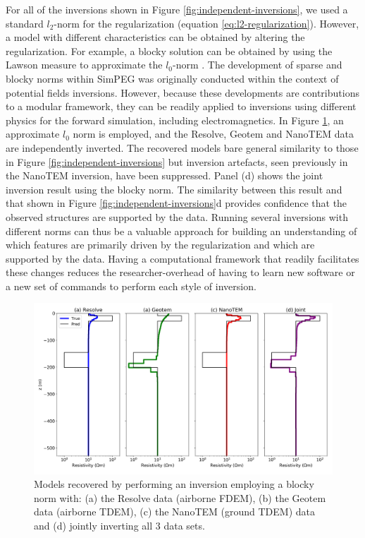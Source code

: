 \documentclass[paper]{geophysics}
\begin{document}
For all of the inversions shown in Figure \ref{fig:independent-inversions}, we used a standard $l_2$-norm for the regularization (equation \ref{eq:l2-regularization}). However, a model with different characteristics can be obtained by altering the regularization. For example, a blocky solution can be obtained by using the Lawson measure to approximate the $l_0$-norm \citep{Fournier2016, Lawson1961}. The development of sparse and blocky norms within SimPEG was originally conducted within the context of potential fields inversions. However, because  these developments are contributions to a modular framework, they can be readily applied to inversions using different physics for the forward simulation, including electromagnetics. In Figure \ref{fig:blocky-inversion}, an approximate $l_0$ norm is employed, and the Resolve, Geotem and NanoTEM data are independently inverted. The recovered models bare general similarity to those in Figure \ref{fig:independent-inversions} but inversion artefacts, seen previously in the NanoTEM inversion, have been suppressed. Panel (d) shows the joint inversion result using the blocky norm. The similarity between this result and that shown in Figure \ref{fig:independent-inversions}d provides confidence that the observed structures are supported by the data. Running several inversions with different norms can thus be a valuable approach for building an understanding of which features are primarily driven by the regularization and which are supported by the data. Having a computational framework that readily facilitates these changes reduces the researcher-overhead of having to learn new software or a new set of commands to perform each style of inversion.


\begin{figure}
    \begin{center}
    \includegraphics[width=0.8\columnwidth]{figures/blocky-inversion.png}
    \end{center}
\caption{
    Models recovered by performing an inversion employing a blocky norm with:
    (a) the Resolve data (airborne FDEM), (b) the Geotem data (airborne TDEM), (c) the NanoTEM (ground TDEM) data and (d) jointly inverting all 3 data sets.
}
\label{fig:blocky-inversion}
\end{figure}
\end{document}
